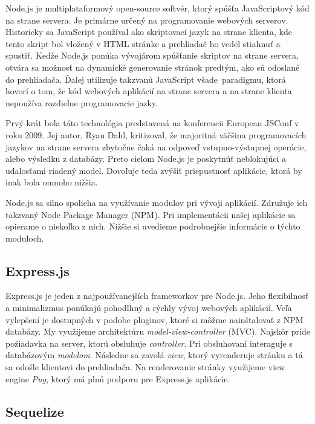 Node.js je multiplataformový open-source softvér, ktorý spúšťa JavaScriptový
kód na strane servera. Je primárne určený na programovanie webových serverov.
Historicky sa JavaScript používal ako skriptovací jazyk
na strane klienta, kde tento skript bol vložený v HTML stránke a prehliadač ho vedel
stiahnuť a spustiť. Kedže Node.js ponúka vývojárom spúšťanie skriptov na strane servera,
otvára sa možnosť na dynamické generovanie stránok predtým, ako sú odoslané do
prehliadača. Ďalej utilizuje takzvanú \glqq JavaScript všade\grqq~paradigmu, ktorá
hovorí o tom, že kód webových aplikácií na strane servera a na strane klienta nepoužíva rozdielne programovacie jazky.~\cite{bib:nodejs}

Prvý krát bola táto technológia predstavená na konferencii European JSConf v roku 2009.
Jej autor, Ryan Dahl, kritizoval, že majoritná väčšina programovacích jazykov
na strane servera zbytočne čaká na odpoveď vstupno-výstupnej operácie, alebo
výsledku z databázy. Preto cieľom Node.js je poskytnúť neblokujúci a udalosťami
riadený model. Dovoľuje teda zvýšiť priepustnosť aplikácie, ktorá by inak bola omnoho
nižšia.

Node.js sa silno spolieha na využívanie modulov pri vývoji aplikácií. Združuje
ich takzvaný Node Package Manager (NPM). Pri implementácii našej aplikácie sa opierame
o niekoľko z nich. Nižšie si uvedieme podrobnejšie informácie o týchto moduloch. \cite{bib:crawford2017comparison}

\subsection{Express.js}
\label{sec:nodejs:expressjs}

Express.js je jeden z najpoužívanejších frameworkov pre Node.js. Jeho flexibilnosť
a minimalizmus ponúkajú pohodlhný a rýchly vývoj webových aplikácií.
Veľa vylepšení je dostupných v podobe pluginov, ktoré si môžme nainštalovať z NPM
databázy. My využijeme architektúru \textit{model-view-controller} (MVC). Najskôr príde
požiadavka na server, ktorú obsluhuje \textit{controller}. Pri obsluhovaní
interaguje s databázovým \textit{modelom}. Následne sa zavolá \textit{view}, ktorý 
vyrenderuje stránku a tá sa odošle klientovi do prehliadača. Na renderovanie
stránky využijeme view engine \textit{Pug}, ktorý má plnú podporu pre Express.js
aplikácie.

\subsection{Sequelize}
\label{sec:nodejs:sequelize}

